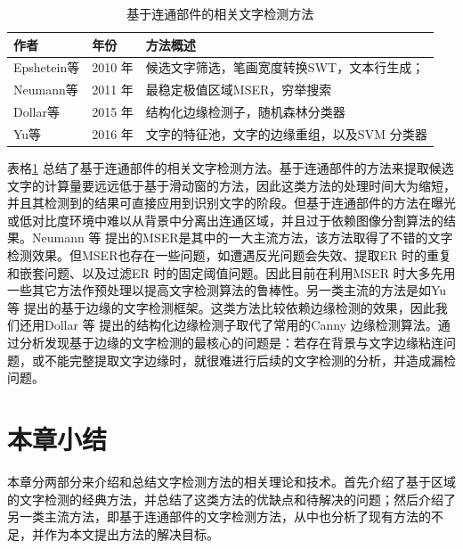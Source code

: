     \begin{table}[!h]
    \small
    \centering
    \caption{基于连通部件的相关文字检测方法}
    \begin{tabular}{p{} p{} p{}}
    \toprule
    作者 & 年份 & 方法概述 \\
    \midrule
    Epshetein等\cite{Epshtein2010Detecting} & 2010 年 & 候选文字筛选，笔画宽度转换SWT，文本行生成；\\
    Neumann等\cite{Neumann2011Text} & 2011 年 &   最稳定极值区域MSER，穷举搜索\\
    Dollar等\cite{Dollar2015Fast} & 2015 年 & 结构化边缘检测子，随机森林分类器 \\
    Yu等\cite{Yu2016Scene} & 2016 年 & 文字的特征池，文字的边缘重组，以及SVM 分类器 \\
    \bottomrule
    \end{tabular}
    \label{tab.c2_connected_component_based}
    \end{table}

    表格\ref{tab.c2_connected_component_based} 总结了基于连通部件的相关文字检测方法。基于连通部件的方法来提取候选文字的计算量要远远低于基于滑动窗的方法，因此这类方法的处理时间大为缩短，并且其检测到的结果可直接应用到识别文字的阶段。但基于连通部件的方法在曝光或低对比度环境中难以从背景中分离出连通区域，并且过于依赖图像分割算法的结果。Neumann 等\cite{Neumann2010A,Neumann2011Text,Neumann2012Real} 提出的MSER是其中的一大主流方法，该方法取得了不错的文字检测效果。但MSER也存在一些问题，如遭遇反光问题会失效、提取ER 时的重复和嵌套问题、以及过滤ER 时的固定阈值问题。因此目前在利用MSER 时大多先用一些其它方法作预处理以提高文字检测算法的鲁棒性。另一类主流的方法是如Yu 等\cite{Yu2016Scene} 提出的基于边缘的文字检测框架。这类方法比较依赖边缘检测的效果，因此我们还用Dollar 等\cite{Dollar2015Fast} 提出的结构化边缘检测子取代了常用的Canny 边缘检测算法。通过分析发现基于边缘的文字检测的最核心的问题是：若存在背景与文字边缘粘连问题，或不能完整提取文字边缘时，就很难进行后续的文字检测的分析，并造成漏检问题。

    \section{本章小结}

    本章分两部分来介绍和总结文字检测方法的相关理论和技术。首先介绍了基于区域的文字检测的经典方法，并总结了这类方法的优缺点和待解决的问题；然后介绍了另一类主流方法，即基于连通部件的文字检测方法，从中也分析了现有方法的不足，并作为本文提出方法的解决目标。

